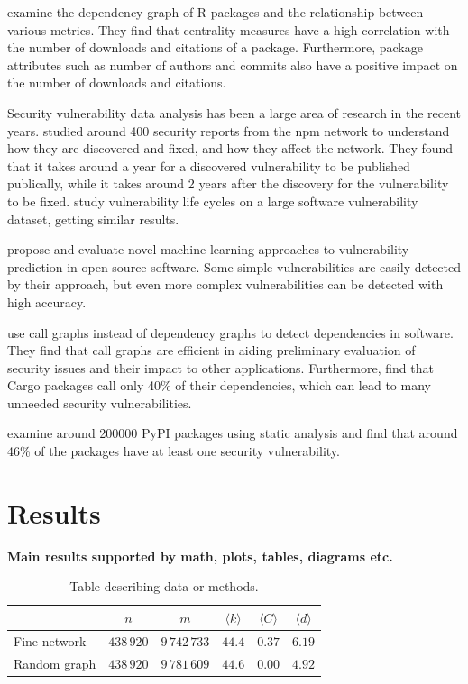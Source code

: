 \documentclass[9pt,twocolumn,twoside]{pnas-report}
\begin{document}
\cite{korkmazrpackages} examine the dependency graph of R packages and the relationship between various metrics.
They find that centrality measures have a high correlation with the number of downloads and citations of a package.
Furthermore, package attributes such as number of authors and commits also have a positive impact on the number of downloads and citations.

Security vulnerability data analysis has been a large area of research in the recent years.
\cite{decan2018vulnerabilities} studied around 400 security reports from the npm network to understand how they are discovered and fixed, and how they affect the network.
They found that it takes around a year for a discovered vulnerability to be published publically, while it takes around 2 years after the discovery for the vulnerability to be fixed.
\cite{shahzad2012} study vulnerability life cycles on a large software vulnerability dataset, getting similar results.

\cite{HANIF2021103009} propose and evaluate novel machine learning approaches to vulnerability prediction in open-source software.
Some simple vulnerabilities are easily detected by their approach, but even more complex vulnerabilities can be detected with high accuracy.

\cite{hejderup2018} use call graphs instead of dependency graphs to detect dependencies in software.
They find that call graphs are efficient in aiding preliminary evaluation of security issues and their impact to other applications.
Furthermore, \cite{hejderup2022prazi} find that Cargo packages call only 40\% of their dependencies, which can lead to many unneeded security vulnerabilities.

\cite{ruohonen2021} examine around 200000 PyPI packages using static analysis and find that around 46\% of the packages have at least one security vulnerability.

\section*{Results}

 {\bf Main results supported by math, plots, tables, diagrams etc.}
\lipsum[1]

\begin{table}[h]\centering%
	\caption{Table describing data or methods.}
	\begin{tabular}{lccccc}\toprule
		             & $n$        & $m$           & $\langle k\rangle$ & $\langle C\rangle$ & $\langle d\rangle$ \\\midrule
		Fine network & $438\,920$ & $9\,742\,733$ & $44.4$             & $0.37$             & $6.19$             \\
		Random graph & $438\,920$ & $9\,781\,609$ & $44.6$             & $0.00$             & $4.92$             \\\bottomrule
	\end{tabular}
	\label{tbl:example}
\end{table}
\end{document}
